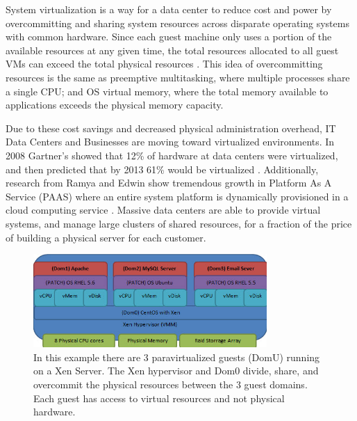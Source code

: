 System virtualization is a way for a data center to reduce cost and power by overcommitting and sharing system resources across disparate operating systems with common hardware.  Since each guest machine only uses a portion of the available resources at any given time, the total resources allocated to all guest VMs can exceed the total physical resources \cite{huber2, amit, buell1}.   This idea of overcommitting resources is the same as preemptive multitasking, where multiple processes share a single CPU; and OS virtual memory, where the total memory available to applications exceeds the physical memory capacity.   

\indent Due to these cost savings and decreased physical administration overhead, IT Data Centers and Businesses are moving toward virtualized environments.  In 2008 Gartner’s showed that 12\% of hardware at data centers were virtualized, and then predicted that by 2013 61\% would be virtualized \cite{gartners}.   Additionally, research from Ramya and Edwin show tremendous growth in Platform As A Service (PAAS) where an entire system platform is dynamically provisioned in a cloud computing service \cite{ramya}.   Massive data centers are able to provide virtual systems, and manage large clusters of shared resources, for a fraction of the price of building a physical server for each customer.

\begin{figure}[!b]
  \begin{center}
    \includegraphics[width=3.5in]{images/VirtualizationExample.jpg}
  \end{center}

  \caption{\small In this example there are 3 paravirtualized guests (DomU) running on a Xen Server.  The Xen hypervisor and Dom0 divide, share, and overcommit the physical resources between the 3 guest domains.  Each guest has access to virtual resources and not physical hardware.}
  \label{virtStack}
\end{figure}

